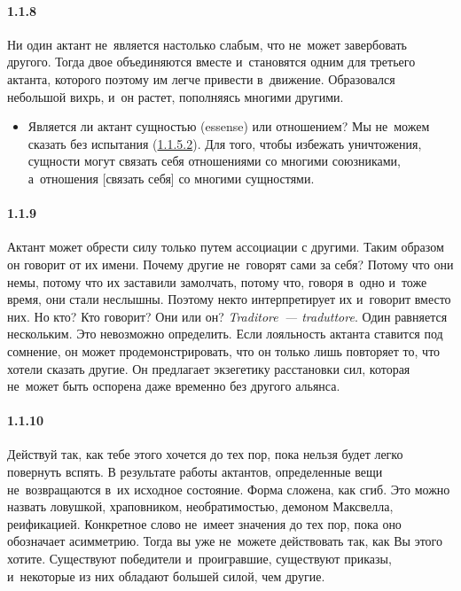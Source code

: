 \paragraph{1.1.8}\hypertarget{par:1.1.8}{} Ни один актант не~является настолько слабым, что не~может завербовать другого. Тогда двое объединяются вместе и~становятся одним для третьего актанта, которого поэтому им легче привести в~движение. Образовался небольшой вихрь, и~он растет, пополняясь многими другими.
\begin{itemize}
	\item Является ли актант сущностью (essense) или отношением? Мы не~можем сказать без испытания (\hyperlink{par:1.1.5.2}{1.1.5.2}). Для того, чтобы избежать уничтожения, сущности могут связать себя отношениями со многими союзниками, а~отношения [связать себя] со многими сущностями.
	\end{itemize}

\paragraph{1.1.9}\hypertarget{par:1.1.9}{} Актант может обрести силу только путем ассоциации с другими. Таким образом он говорит от их имени. Почему другие не~говорят сами за себя? Потому что они немы, потому что их заставили замолчать, потому что, говоря в~одно и~тоже время, они стали неслышны. Поэтому некто интерпретирует их и~говорит вместо них. Но кто? Кто говорит? Они или он? {\itshape Traditore~--- traduttore}. Один равняется нескольким. Это невозможно определить. Если лояльность актанта ставится под сомнение, он может продемонстрировать, что он только лишь повторяет то, что хотели сказать другие. Он предлагает экзегетику расстановки сил, которая не~может быть оспорена даже временно без другого альянса.

\paragraph{1.1.10}\hypertarget{par:1.1.10}{} Действуй так, как тебе этого хочется до тех пор, пока нельзя будет легко повернуть вспять. В результате работы актантов, определенные вещи не~возвращаются в~их исходное состояние. Форма сложена, как сгиб. Это можно назвать ловушкой, храповником, необратимостью, демоном Максвелла, реификацией. Конкретное слово не~имеет значения до тех пор, пока оно обозначает асимметрию. Тогда вы
уже не~можете действовать так, как Вы этого хотите. Существуют победители и~проигравшие, существуют приказы, и~некоторые из них обладают большей силой, чем другие.

